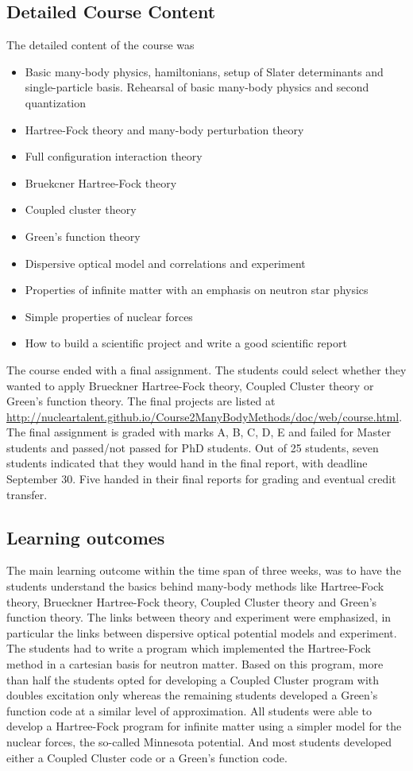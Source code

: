 \documentclass[prc,amsart,english]{revtex4}
\begin{document}
\subsection{Detailed Course Content}


The detailed content of the course was 
\begin{itemize}
\item Basic many-body physics, hamiltonians,
setup of Slater determinants and single-particle basis.
Rehearsal of basic many-body physics and second quantization
\item Hartree-Fock theory and many-body perturbation theory
\item Full configuration interaction theory
\item Bruekcner Hartree-Fock theory
\item Coupled cluster theory
\item Green's function theory
\item Dispersive optical model and correlations and experiment
\item Properties of infinite matter with an emphasis on neutron star physics
\item Simple properties of nuclear forces
\item How to build a scientific project and write a good scientific report
\end{itemize}

The course ended with a final assignment. 
The students could select whether they wanted to apply Brueckner Hartree-Fock theory, Coupled Cluster theory or Green's function theory. The final projects
are listed at \url{http://nucleartalent.github.io/Course2ManyBodyMethods/doc/web/course.html}.
The final assignment  is graded
with marks A, B, C, D, E and failed for Master students and passed/not passed for PhD students.
Out of 25 students, seven students indicated that they would hand in the final report, with deadline September 30.  Five handed in their final reports for grading and eventual credit transfer.   

\subsection{Learning outcomes}  The main learning outcome within the time span of three weeks, was to have the students
understand the basics behind many-body methods like Hartree-Fock theory, Brueckner Hartree-Fock theory, Coupled Cluster theory and Green's function theory. The links between theory and experiment were emphasized, in particular the links between dispersive optical potential models
and experiment. 
The students had to write a program which implemented the Hartree-Fock method in a cartesian basis for neutron matter. Based on this program, more than half the students opted for developing a Coupled Cluster program with doubles excitation only whereas the remaining students
developed a Green's function code at a similar level of approximation. All students were able to develop a Hartree-Fock program for infinite matter using a simpler model for the nuclear forces, the so-called Minnesota potential. And most students developed either a Coupled Cluster code
or a Green's function code. 
\end{document}
